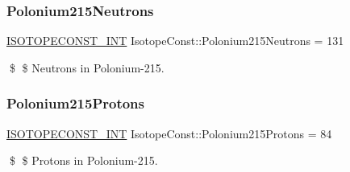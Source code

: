 \subsubsection{\texorpdfstring{Polonium215\+Neutrons}{Polonium215Neutrons}}
{\footnotesize\ttfamily \mbox{\hyperlink{group___isotope_const-_macros_ga5f18360b3e99483a35c32d789e62621c}{I\+S\+O\+T\+O\+P\+E\+C\+O\+N\+S\+T\+\_\+\+I\+NT}} Isotope\+Const\+::\+Polonium215\+Neutrons = 131}

\$ \$ Neutrons in Polonium-\/215. \mbox{\label{group___isotope_const-_polonium-_po215_gae072a899fc950fad2b5a6559ac6ef7f8}} 
\subsubsection{\texorpdfstring{Polonium215\+Protons}{Polonium215Protons}}
{\footnotesize\ttfamily \mbox{\hyperlink{group___isotope_const-_macros_ga5f18360b3e99483a35c32d789e62621c}{I\+S\+O\+T\+O\+P\+E\+C\+O\+N\+S\+T\+\_\+\+I\+NT}} Isotope\+Const\+::\+Polonium215\+Protons = 84}

\$ \$ Protons in Polonium-\/215. 